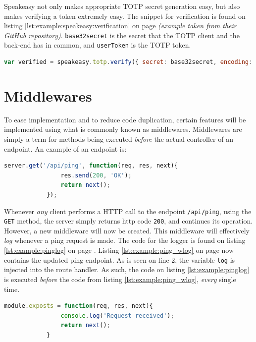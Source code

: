 			Speakeasy not only makes appropriate TOTP secret generation easy, but also makes verifying a token extremely easy. The snippet for verification is found on listing \ref{lst:example:speakeasy:verification} on page \pageref{lst:example:speakeasy:verification} \emph{(example taken from their GitHub repository)}. \verb=base32secret= is the secret that the TOTP client and the back-end has in common, and \verb=userToken= is the TOTP token.


			\begin{lstlisting}[gobble=16,language=JavaScript,caption={Verifying a TOTP token using Speakeasy},label={lst:example:speakeasy:verification}]
                var verified = speakeasy.totp.verify({ secret: base32secret, encoding: 'base32', token: userToken });
			\end{lstlisting}
	
	\section{Middlewares}
		\label{sec:impl:middleware}
		To ease implementation and to reduce code duplication, certain features will be implemented using what is commonly known as middlewares. Middlewares are simply a term for methods being executed \emph{before} the actual controller of an endpoint. An example of an endpoint is:
		\begin{lstlisting}[gobble=12,language=JavaScript]
            server.get('/api/ping', function(req, res, next){
                res.send(200, 'OK');
                return next();
            });		
		\end{lstlisting}

		Whenever \emph{any} client performs a HTTP call to the endpoint \verb=/api/ping=, using the \verb=GET= method, the server simply returns http code \verb=200=, and continues its operation. However, a new middleware will now be created. This middleware will effectively \emph{log} whenever a ping request is made. The code for the logger is found on listing \ref{lst:example:pinglog} on page \pageref{lst:example:pinglog}. Listing \ref{lst:example:ping_wlog} on page \pageref{lst:example:ping_wlog} now contains the updated ping endpoint. As is seen on line 2, the variable \verb=log= is injected into the route handler. As such, the code on listing \ref{lst:example:pinglog} is executed \emph{before} the code from listing \ref{lst:example:ping_wlog}, \emph{every} single time.

		\begin{lstlisting}[gobble=12,language=JavaScript,caption={Log Middleware},label={lst:example:pinglog}]
            module.exposts = function(req, res, next){
                console.log('Request received');
                return next();
            }
		\end{lstlisting}

